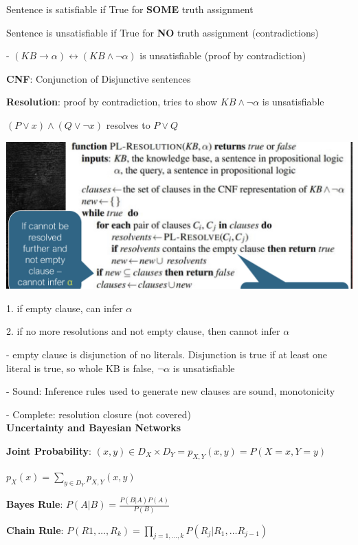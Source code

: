 \documentclass[10pt, a4paper]{article}
\newcommand{\highlight}[1]{{\color{red}\textbf{#1}}}
\newcommand{\red}[1]{{\color{red}#1}}
\newcommand{\green}[1]{{\color{PineGreen}#1}}
\newcommand{\header}[1]{{\normalsize\textbf{#1}}}
\newcommand{\tab}[0]{\hspace*{2mm}}
\begin{document}
\begin{multicols*}{3}
		Sentence is \green{satisfiable} if True for \highlight{SOME} truth assignment

		Sentence is \red{unsatisfiable} if True for \highlight{NO} truth assignment (contradictions)

		\tab{} - $(KB \rightarrow \alpha) \leftrightarrow (KB \wedge \neg \alpha)$ is unsatisfiable (proof by contradiction)

		\textbf{CNF}: Conjunction of Disjunctive sentences

		\textbf{Resolution}: proof by contradiction, tries to show $KB \wedge \neg \alpha$ is \red{unsatisfiable}

		$(P \vee x) \wedge (Q \vee \neg x)$ resolves to $P \vee Q$

		\includegraphics*[scale=0.14]{./assets/resolution.jpeg}

		1. if empty clause, can infer $\alpha$

		2. if no more resolutions and not empty clause, then cannot infer $\alpha$

		- empty clause is \red{disjunction of no literals}. Disjunction is true if at least one literal is true,
		so whole KB is false, $\neg \alpha$ is unsatisfiable

		- \green{Sound}: Inference rules used to generate new clauses are sound, monotonicity

		- \green{Complete}: resolution closure (not covered)\\

		\header{Uncertainty and Bayesian Networks}

		\textbf{Joint Probability}: $(x, y) \in D_X \times D_Y = p_{X, Y}(x, y) = P(X = x, Y = y)$

		$p_X(x) = \sum_{y \in D_Y} p_{X, Y}(x, y)$

		\textbf{Bayes Rule}: $P(A | B) = \frac{P(B | A)P(A)}{P(B)}$

		\textbf{Chain Rule}: $P(R1, \dots, R_k) = \prod_{j = 1, \dots, k} P(R_j | R_1, \dots R_{j - 1})$


\end{multicols*}
\end{document}
